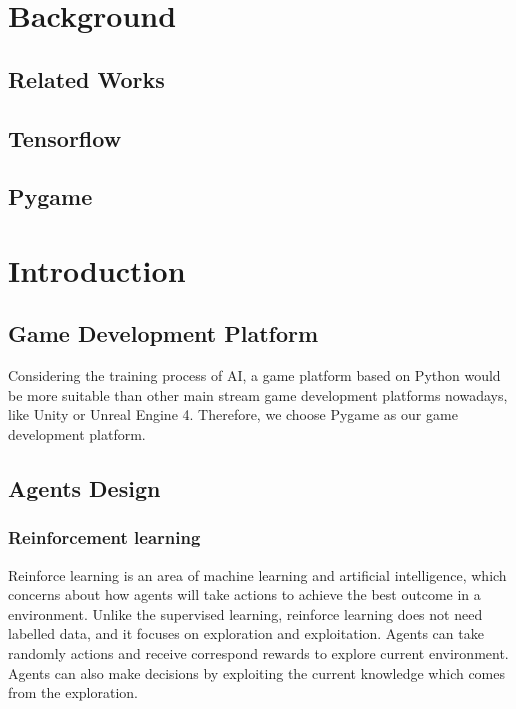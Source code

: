 \documentclass[14pt]{extarticle}
\begin{document}

\section{Background}

\subsection{Related Works}

\subsection{Tensorflow}

\subsection{Pygame}



\section{Introduction}

\subsection{Game Development Platform}
Considering the training process of AI, a game platform based on Python would be more suitable than other main stream game development platforms nowadays, like Unity or Unreal Engine 4. Therefore, we choose Pygame as our game development platform.

\subsection{Agents Design}
\subsubsection{Reinforcement learning}

Reinforce learning is an area of machine learning and artificial intelligence, which concerns about how agents will take actions to achieve the best outcome in a environment. Unlike the supervised learning, reinforce learning does not need labelled data, and it focuses on exploration and exploitation. Agents can take randomly actions and receive correspond rewards to explore current environment. Agents can also make decisions by exploiting the current knowledge which comes from the exploration.
\end{document}
